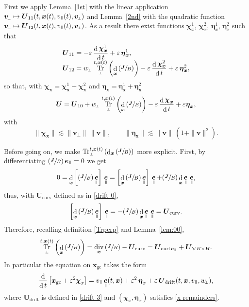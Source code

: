 \documentclass[JEP,XML,SOM,Unicode]{cedram}
\newcommand\mto{\mathchoice{\longmapsto}{\mapsto}{\mapsto}{\mapsto}}
\newcommand{\sperp}{{\scriptscriptstyle\perp}}
\newcommand{\Psfrac}[2]{(\sfrac{#1}{#2})}
\let\eps\varepsilon
\DeclareMathOperator\dD{d}\let\dd\dD
\DeclareMathOperator{\Tr}{Tr}
\DeclareMathOperator{\Div}{div}
\DeclareMathOperator{\Curl}{curl}
\theoremstyle{plain}
\theoremstyle{definition}
\newcommand{\be}{\begin{equation}}
\newcommand{\ee}{\end{equation}}
\newcommand\bB{{\boldsymbol B}}
\newcommand\bJ{{\boldsymbol J}}
\newcommand\bU{{\boldsymbol U}}
\let\bfU\bU
\newcommand\bfv{{\boldsymbol v}}
\newcommand\bfx{{\boldsymbol x}}
\newcommand\bfeta{{\boldsymbol \eta}}
\newcommand\bfchi{{\boldsymbol \chi}}
\DeclareMathOperator{\beD}{\boldsymbol{e}}
\newcommand\eDpar{\beD_\mypar}
\newcommand\vpar{v_\mypar}
\newcommand\bvperp{\bfv_{\!\sperp}}
\newcommand\eperp{w_{\!\sperp}}
\newcommand{\Trperp}[1]{\Tr_\sperp^{#1}}
\newcommand{\GC}{\bfx_\mathrm{gc}}
\newcommand{\gradB}{\bU_{\nabla B\times\bB}}
\newcommand{\curvB}{\bU_{\mathrm{curv}}}
\newcommand{\rotB}{\bU_{\Curl\eDpar}}
\newcommand{\Ud}{\bU_{\mathrm{drift}}}
\newcommand{\mypar}{{\mkern3mu\vphantom{\perp}\vrule depth 0pt\mkern2mu\vrule depth 0pt\mkern3mu}}
\begin{document}
First we apply Lemma~\ref{1st} with the linear application $\bvperp\mto \bfU_{11}(t,\bfx(t),\vpar(t), \bvperp)$ and Lemma~\ref{2nd} with the quadratic function $\bvperp\mto \bfU_{12}(t,\bfx(t),\vpar(t), \bvperp)$. As a result there exist functions $\bfchi_x^1$, $\bfchi_x^2$, $\bfeta_x^1$, $\bfeta_x^2$ such that
\begin{align*}
\bfU_{11}&= -\eps\,\frac{\dD
\bfchi_\bfx^1}{\dD t} + \eps\,\bfeta_\bfx^1,\\[-5pt]
\bfU_{12}&=
\eperp\,\Trperp{t,\bfx(t)}\left(\dD_\bfx\left(\sfrac{\bJ}{B}\right)\right) -\eps\,\frac{\dD
\bfchi_\bfx^2}{\dD t} + \eps\,\bfeta_\bfx^2,
\end{align*}
so that, with $\bfchi_\bfx=\bfchi_\bfx^1+\bfchi_\bfx^2$ and $\bfeta_\bfx =\bfeta_\bfx^1
+\bfeta_\bfx^2$
\[
\bU=\bU_{10}+\eperp\,\Trperp{t,\bfx(t)}\left(\dD_\bfx\left(\sfrac{\bJ}{B}\right)\right)
-\eps\,\frac{\dD\bfchi_\bfx}{\dD t}+\eps\bfeta_\bfx,
\]
with
\be\label{x-remainders}
\|\bfchi_\bfx\|\lesssim \|\bvperp\|\,\|\bfv\|,\qquad
\|\bfeta_\bfx\| \lesssim \|\bfv\|\,(1+\|\bfv\|^2).
\ee

Before going on, we make $\Trperp{t,\bfx(t)}\left(\dD_\bfx\left(\sfrac{\bJ}{B}\right)\right)$
more explicit. First, by differentiating $\Psfrac{\bJ}{B} \eDpar=0$ we get
\[
0 = \dD_\bfx\left[\left(\sfrac{\bJ}{B}\right)\eDpar\right]\,\eDpar = \left[\dD_\bfx\left(\sfrac{\bJ}{B}\right)\eDpar\right]\,\eDpar + \Psfrac{\bJ}{B}\dD_\bfx \eDpar\,\eDpar,
\]
thus, with $\curvB$ defined as in \eqref{drift-0},
\[
\left[\dD_\bfx\left(\sfrac{\bJ}{B}\right)\eDpar\right]\,\eDpar =
-\Psfrac{\bJ}{B}\dD_\bfx \eDpar\,\eDpar = \curvB.
\]
Therefore, recalling definition \eqref{Trperp} and Lemma~\ref{lem:00},
\[
\Trperp{t,\bfx(t)}\left(\dD_\bfx\left(\sfrac{\bJ}{B}\right) \right)= \Div_\bfx\left(\sfrac{\bJ}{B}\right)
-\curvB= \rotB + \gradB.
\]
In particular the equation on $\GC$ takes the form
\[
\frac{\dD}{\dD t}\left[\GC+\eps^2\bfchi_x\right]
= \vpar\eDpar(t,\bfx)+\eps^2\,\bfeta_x +\eps\,\Ud(t,\bfx,\vpar,\eperp),
\]
where $\Ud$ is defined in \eqref{drift-3} and $(\bfchi_x,\bfeta_x)$ satisfies \eqref{x-remainders}.
\end{document}
